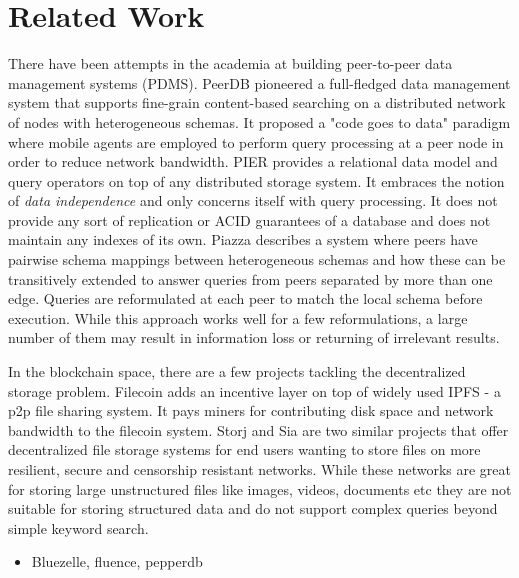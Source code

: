 \section{Related Work}
There have been attempts in the academia at building peer-to-peer data management systems (PDMS). PeerDB \cite{PeerDB} pioneered a full-fledged data management system that supports fine-grain content-based searching on a distributed network of nodes with heterogeneous schemas. It proposed a "code goes to data" paradigm where mobile agents are employed to perform query processing at a peer node in order to reduce network bandwidth. PIER \cite{PIER} provides a relational data model and query operators on top of any distributed storage system. It embraces the notion of \textit{data independence} and only concerns itself with query processing. It does not provide any sort of replication or ACID guarantees of a database and does not maintain any indexes of its own. Piazza \cite{Piazza} describes a system where peers have pairwise schema mappings between heterogeneous schemas and how these can be transitively extended to answer queries from peers separated by more than one edge. Queries are reformulated at each peer to match the local schema before execution. While this approach works well for a few reformulations, a large number of them may result in information loss or returning of irrelevant results.
\newline\newline


In the blockchain space, there are a few projects tackling the decentralized storage problem. Filecoin \cite{Filecoin}
adds an incentive layer on top of widely used IPFS \cite{ipfs} - a p2p file sharing system. It pays miners for
contributing disk space and network bandwidth to the filecoin system. Storj \cite{Storj} and Sia \cite{Sia} are two
similar projects that offer decentralized file storage systems for end users wanting to store files on more resilient,
secure and censorship resistant networks. While these networks are great for storing large unstructured files like
images, videos, documents etc they are not suitable for storing structured data and do not support complex queries
beyond simple keyword search.

    \begin{itemize}
        \item Bluezelle, fluence, pepperdb
    \end{itemize}


